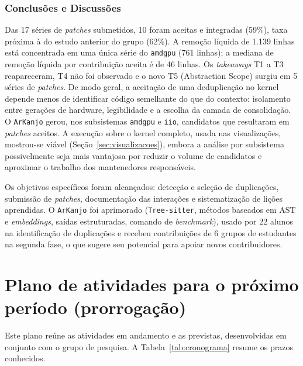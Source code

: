 \documentclass[oneside]{abntlatex}
\begin{document}
\section{Conclusões e Discussões}

Das 17 séries de \textit{patches} submetidos, 10 foram aceitas e integradas (59\%), taxa próxima à do estudo anterior do grupo (62\%). A remoção líquida de 1.139 linhas está concentrada em uma única série do \texttt{amdgpu} (761 linhas); a mediana de remoção líquida por contribuição aceita é de 46 linhas. Os \textit{takeaways} T1 a T3 reapareceram, T4 não foi observado e o novo T5 (Abstraction Scope) surgiu em 5 séries de \textit{patches}. De modo geral, a aceitação de uma deduplicação no kernel depende menos de identificar código semelhante do que do contexto: isolamento entre gerações de hardware, legibilidade e a escolha da camada de consolidação. O \texttt{ArKanjo} gerou, nos subsistemas \texttt{amdgpu} e \texttt{iio}, candidatos que resultaram em \textit{patches} aceitos. A execução sobre o kernel completo, usada nas visualizações, mostrou-se viável (Seção~\ref{sec:visualizacoes}), embora a análise por subsistema possivelmente seja mais vantajosa por reduzir o volume de candidatos e aproximar o trabalho dos mantenedores responsáveis.

Os objetivos específicos foram alcançados: detecção e seleção de duplicações, submissão de \textit{patches}, documentação das interações e sistematização de lições aprendidas. O \texttt{ArKanjo} foi aprimorado (\texttt{Tree-sitter}, métodos baseados em AST e \textit{embeddings}, saídas estruturadas, comando de \textit{benchmark}), usado por 22 alunos na identificação de duplicações e recebeu contribuições de 6 grupos de estudantes na segunda fase, o que sugere seu potencial para apoiar novos contribuidores.


\cleardoublepage

\part{Plano de atividades para o próximo período (prorrogação)}

Este plano reúne as atividades em andamento e as previstas, desenvolvidas em conjunto com o grupo de pesquisa. A Tabela~\ref{tab:cronograma} resume os prazos conhecidos.
\end{document}
